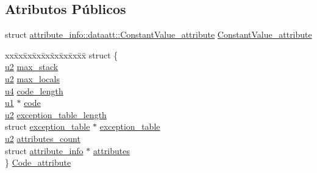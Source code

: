 \subsection*{Atributos Públicos}
\begin{DoxyCompactItemize}
\item 
struct \hyperlink{structattribute__info_1_1dataatt_1_1ConstantValue__attribute}{attribute\+\_\+info\+::dataatt\+::\+Constant\+Value\+\_\+attribute} \hyperlink{unionattribute__info_1_1dataatt_a7528732c04d522ee66b03ac3ee68a328}{Constant\+Value\+\_\+attribute}
\item 
\begin{tabbing}
xx\=xx\=xx\=xx\=xx\=xx\=xx\=xx\=xx\=\kill
struct \{\\
\>\hyperlink{ClassLoader_8h_a5f223212eef04d10a4550ded680cb1cf}{u2} \hyperlink{unionattribute__info_1_1dataatt_a5324cb4f9387dd83fbf918a214e9ecf5}{max\_stack}\\
\>\hyperlink{ClassLoader_8h_a5f223212eef04d10a4550ded680cb1cf}{u2} \hyperlink{unionattribute__info_1_1dataatt_a50f68cdf74cc0a4ae6cfdff4f9deff56}{max\_locals}\\
\>\hyperlink{ClassLoader_8h_aedf6ddc03df8caaaccbb4c60b9a9b850}{u4} \hyperlink{unionattribute__info_1_1dataatt_a632ec76b539aef919ad1b53bc06ae202}{code\_length}\\
\>\hyperlink{ClassLoader_8h_a216a9f8b04b4f0af84a4ca9d1d85a6ca}{u1} $\ast$ \hyperlink{unionattribute__info_1_1dataatt_ae358021d0aeaf42c2946d7ca9bde4561}{code}\\
\>\hyperlink{ClassLoader_8h_a5f223212eef04d10a4550ded680cb1cf}{u2} \hyperlink{unionattribute__info_1_1dataatt_aab4fba017aae830c5d0ee6e5498c4e0a}{exception\_table\_length}\\
\>struct \hyperlink{structexception__table}{exception\_table} $\ast$ \hyperlink{unionattribute__info_1_1dataatt_ad8651df15e6a1ce7795fb5bbfc036497}{exception\_table}\\
\>\hyperlink{ClassLoader_8h_a5f223212eef04d10a4550ded680cb1cf}{u2} \hyperlink{unionattribute__info_1_1dataatt_a2684a4c2f7e2e9bf618563c5aa3f0bad}{attributes\_count}\\
\>struct \hyperlink{structattribute__info}{attribute\_info} $\ast$ \hyperlink{unionattribute__info_1_1dataatt_a3e6b34fe04111fe1a6b2d386d7c7e4f3}{attributes}\\
\} \hyperlink{unionattribute__info_1_1dataatt_ad91d6c59069565594996c8f6f94633d3}{Code\_attribute}\\


\end{tabbing}
\end{DoxyCompactItemize}
